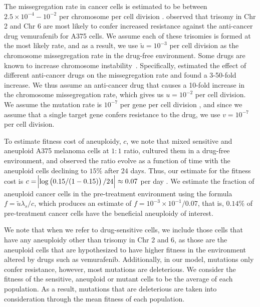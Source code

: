 \documentclass[12pt]{extarticle}
\begin{document}
The missegregation rate in cancer cells is estimated to be between $2.5\times10^{-4}-10^{-2}$ per chromosome per cell division \citep{shi2005chromosome,thompson2008examining}. \citet{ippolito2021gene} observed that trisomy in Chr 2 and Chr 6 are most likely to confer increased resistance against the anti-cancer drug vemurafenib for A375 cells. We assume each of these trisomies is formed at the most likely rate, and as a result, we use $\tilde{u}=10^{-3}$ per cell division as the chromosome missegregation rate in the drug-free environment. 
Some drugs are known to increase chromosome instability~\citep{wang2019molecular,mason2017functional}. 
Specifically, \citet{lee2016effects} estimated the effect of different anti-cancer drugs on the missegregation rate and found a 3-50-fold increase.
We thus assume an anti-cancer drug that causes a 10-fold increase in the chromosome missegregation rate, which gives us $u=10^{-2}$ per cell division. We assume the mutation rate is $10^{-7}$ per gene per cell division \citep{loeb2001mutator}, and since we assume that a single target gene confers resistance to the drug, we use $v=10^{-7}$ per cell division. 

To estimate fitness cost of aneuploidy, $c$, we note that \citet{lukow2021chromosomal} mixed sensitive and aneuploid A375 melanoma cells at $1:1$ ratio, cultured them in a drug-free environment, and observed the ratio evolve as a function of time with the aneuploid cells declining to $15\%$ after 24 days. Thus, our estimate for the fitness cost is $c=\abs{\log\left(0.15/(1-0.15)\right)/24}\approx0.07$ per day \citep{chevin2011measuring}.
We estimate the fraction of aneuploid cancer cells in the pre-treatment environment using the formula $f=\tilde{u}\lambda_s / c$, which produces an estimate of $f=10^{-3}\times10^{-1}/0.07$, that is, $0.14\%$ of pre-treatment cancer cells have the beneficial aneuploidy of interest. %

We note that when we refer to drug-sensitive cells, we include those cells that have any aneuploidy other than trisomy in Chr 2 and 6, as those are the aneuploid cells that are hypothesized to have higher fitness in the environment altered by drugs such as vemurafenib. Additionally, in our model, mutations only confer resistance, however, most mutations are deleterious. We consider the fitness of the sensitive, aneuploid or mutant cells to be the average of each population. As a result, mutations that are deleterious are taken into consideration through the mean fitness of each population. %
\end{document}
